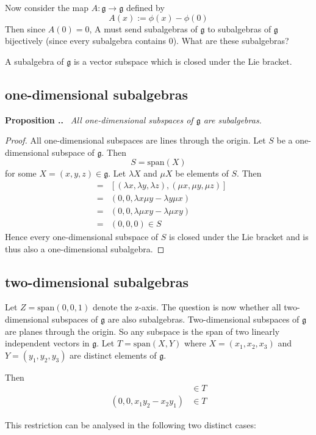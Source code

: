 \documentclass[honours]{UNSWthesis}
\newcommand{\g}{\mathfrak{g}}
\newcommand{\1}{\mathbf{e}_{1}}
\newcommand{\2}{\mathbf{e}_{3}}
\newcommand{\3}{\mathbf{e}_{3}}
\newcounter{Item}[section]
\newenvironment{Proposition}{\medskip
                            \refstepcounter{Item}
                            \noindent
                           {\bf Proposition \thesection.\theItem.}\ %
                            \begingroup \sl}
                           {\endgroup\medskip}
\begin{document}
Now consider the map $A:\g \longrightarrow \g$ defined by 
\[
A(x):= \phi(x)-\phi(0)
\]
Then since $A(0)=0$, A must send subalgebras of $\g$ to subalgebras of $\g$ bijectively (since every subalgebra contains $0$). What are these subalgebras?

A subalgebra of $\g$ is a vector subspace which is closed under the Lie bracket. 
\subsection{one-dimensional subalgebras}
\begin{Proposition}
All one-dimensional subspaces of $\g$ are subalgebras.
\end{Proposition}

\begin{proof}
All one-dimensional subspaces are lines through the origin. Let $S$ be a one-dimensional subspace of $\g$. Then 
\[
S= \text{span}(X)
\]
for some $X=(x,y,z) \in \g$. Let $\lambda X$ and $\mu X$ be elements of $S$. Then 
\begin{eqnarray*}
[\lambda X,\mu X] &=& [(\lambda x, \lambda y, \lambda z), (\mu x, \mu y, \mu z)] \\
&=& (0,0, \lambda x \mu y - \lambda y \mu x) \\
&=& (0,0, \lambda  \mu xy - \lambda \mu xy) \\
&=& (0,0,0) \in S
\end{eqnarray*}
Hence every one-dimensional subspace of $S$ is closed under the Lie bracket and is thus also a one-dimensional subalgebra. 
\end{proof}

\subsection{two-dimensional subalgebras}
Let $Z=\text{span}(0,0,1)$ denote the z-axis.
The question is now whether all two-dimensional subspaces of $\g$ are also subalgebras. Two-dimensional subspaces of $\g$ are planes through the origin. So any subspace is the span of two linearly independent vectors in $\g$.
Let $T= \text{span}(X ,Y)$ where $X=(x_{1},x_{2},x_{3})$ and $Y=(y_{1},y_{2},y_{3})$ are distinct elements of $\g$.

Then  
\begin{eqnarray*}
  [X,Y] & \in T \\
(0,0, x_{1}y_{2}-x_{2}y_{1}) & \in T
\end{eqnarray*}
   
This restriction can be analysed in the following two distinct cases:
\end{document}
